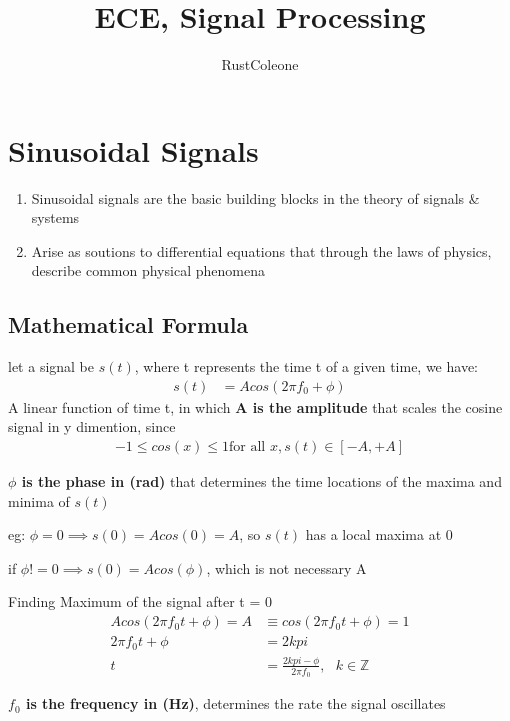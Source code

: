 \documentclass{article}
\author{RustColeone}
\title{ECE, Signal Processing}
\newlength\tindent
\renewcommand{\indent}{\hspace*{\tindent}}
\begin{document}
\maketitle
\newpage
\tableofcontents
\newpage
\section{Sinusoidal Signals}
    \begin{enumerate}
        \item Sinusoidal signals are the basic building blocks in the theory of signals \& systems
        \item Arise as soutions to differential equations that through the laws of physics, describe common physical phenomena
    \end{enumerate}
    \subsection{Mathematical Formula}
    let a signal be $s(t)$, where t represents the time t of a given time, we have:
    \begin{align}
        s(t) &= A cos(2 \pi f_0 + \phi)
    \end{align}
    A linear function of time t, in which \textbf{A is the amplitude} that scales the cosine signal in y dimention, since
    \begin{align}
        -1 \leq cos(x) \leq 1 \text{for all } x, s(t) \in [-A, +A]
    \end{align}

    \textbf{$\phi$ is the phase in (rad)} that determines the time locations of the maxima and minima of $s(t)$\\\indent

    eg: $\phi = 0 \implies s(0) = Acos(0) = A$, so $s(t)$ has a local maxima at 0

    if $\phi != 0 \implies s(0) = Acos(\phi)$, which is not necessary A\\\indent
    
    Finding Maximum of the signal after t = 0
    \begin{align}
        Acos(2 \pi f_0 t + \phi) = A &\equiv cos(2 \pi f_0 t + \phi) = 1 \\
        2 \pi f_0 t + \phi &= 2 k pi \\
        t &= \frac{2 k pi - \phi}{2 \pi f_0}, \text{ } k \in \mathbb{Z}
    \end{align}

    \textbf{$f_0$ is the frequency in (Hz)}, determines the rate the signal oscillates
    
\end{document}
